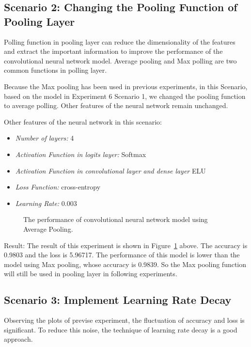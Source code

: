\documentclass[]{UCD_CS_FYP_Report}
\begin{document}
\subsection{Scenario 2: Changing the Pooling Function of Pooling Layer}
Polling function in pooling layer can reduce the dimensionality of the features and extract the important information to improve the performance of the convolutional neural network model. Average pooling and Max polling are two common functions in polling layer.

Because the Max pooling has been used in previous experiments, in this Scenario, based on the model in Experiment 6 Scenario 1, we changed the pooling function to average polling. Other features of the neural network remain unchanged.

Other features of the neural network in this scenario:
\begin{itemize}
\item {\sl Number of layers: } 4
\item {\sl Activation Function in logits layer:} Softmax
\item {\sl Activation Function in convolutional layer and dense layer} ELU
\item {\sl Loss Function:} cross-entropy
\item {\sl Learning Rate: } 0.003
\end{itemize}
\begin{figure}[h]
\centering
\fboxsep 2mm
\caption{\label{fig:MNIST_CNN_S2E1} The performance of convolutional neural network model using Average Pooling.}
\end{figure}
Result: The result of this experiment is shown in Figure~\ref{fig:MNIST_CNN_S2E1} above. The accuracy is 0.9803 and the loss is 5.96717. The performance of this model is lower than the model using Max pooling, whose accuracy is 0.9839. So the Max pooling function will still be used in pooling layer in following experiments.
%
\subsection{Scenario 3: Implement Learning Rate Decay}
Observing the plots of previse experiment, the fluctuation of accuracy and loss is significant. To reduce this noise, the technique of learning rate decay is a good approach. 
\end{document}
